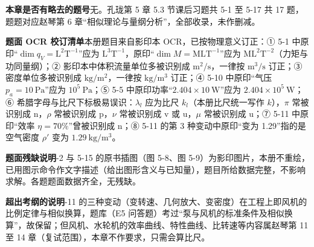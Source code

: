 \begin{tishi}
\noindent\textbf{本章是否有略去的题号}\quad 无。孔珑第 5 章 5.3 节课后习题共 5-1 至 5-17 共 17 题，题题对应赵琴第 6 章“相似理论与量纲分析”，全部收录，未作删减。

\noindent\textbf{题面 OCR 校订清单}\quad 本册题目来自影印本 OCR，已按物理意义订正：① 5-1 中原印“$\dim q_V=\mathrm{L^2T^{-1}}$”应为 $\mathrm{L^3T^{-1}}$，原印“$\dim M=\mathrm{MLT^{-1}}$”应为 $\mathrm{ML^2T^{-2}}$（力矩与功同量纲）；② 影印本中体积流量单位多被识别成 $\mathrm{m^2/s}$，一律按 $\mathrm{m^3/s}$ 订正；③ 密度单位多被识别成 $\mathrm{kg/m^2}$，一律按 $\mathrm{kg/m^3}$ 订正；④ 5-10 中原印“气压 $p_a=10\ \mathrm{Pa}$”应为 $10^5\ \mathrm{Pa}$；⑤ 5-5 中原印功率“$2.404\times10\ \mathrm{W}$”应为 $2.404\times10^5\ \mathrm{W}$；⑥ 希腊字母与比尺下标极易误识：$\lambda_l$ 应为比尺 $k_l$（本册比尺统一写作 $k$），$\pi$ 常被识别成 n，$\rho$ 常被识别成 p，$\nu$ 常被识别成 v 或 u，$\mu$ 常被识别成 u；⑦ 5-11 中原印“效率 $\eta=70\%$”曾被识别成 n；⑧ 5-11 的第 3 种变动中原印“变为 1.29”指的是空气密度 $\rho'$ 变为 $1.29\ \mathrm{kg/m^3}$。

\noindent\textbf{题面残缺说明}-2 与 5-15 的原书插图（图 5-8、图 5-9）为影印图片，本册不重绘，已用图示命令作文字描述（给出图形含义与已知量），题目所给数据完整，不影响求解。各题题面数据齐全，无残缺。

\noindent\textbf{超出考纲的说明}-11 的三种变动（变转速、几何放大、变密度）在工程上即风机的比例定律与相似换算，题库（E5 问答题）考过“泵与风机的标准条件及相似换算”，故保留；但风机、水轮机的效率曲线、特性曲线、比转速等内容属赵琴第 11 至 14 章（复试范围），本章不作要求，只需会算比尺。
\end{tishi}
